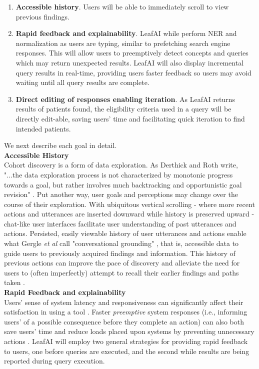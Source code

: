 \documentclass[../main.tex]{subfiles}
\begin{document}
\begin{enumerate}
    \item \textbf{Accessible history}. Users will be able to immediately scroll to view previous findings.
    \item \textbf{Rapid feedback and explainability}. LeafAI while perform NER and normalization as users are typing, similar to prefetching search engine responses. This will allow users to preemptively detect concepts and queries which may return unexpected results. LeafAI will also display incremental query results in real-time, providing users faster feedback so users may avoid waiting until all query results are complete.
    \item \textbf{Direct editing of responses enabling iteration}. As LeafAI returns results of patients found, the eligibility criteria used in a query will be directly edit-able, saving users' time and facilitating quick iteration to find intended patients.
\end{enumerate}

\noindent We next describe each goal in detail. \\

\noindent \textbf{Accessible History} \\
Cohort discovery is a form of data exploration. As Derthick and Roth write, "...the data exploration process is not characterized by monotonic progress towards a goal, but rather involves much backtracking and opportunistic goal revision" \cite{derthick2001enhancing}. Put another way, user goals and perceptions may change over the course of their exploration. With ubiquitous vertical scrolling - where more recent actions and utterances are inserted downward while history is preserved upward - chat-like user interfaces facilitate user understanding of past utterances and actions. Persisted, easily viewable history of user utterances and actions enable what Gergle \textit{et al} call "conversational grounding" \cite{gergle2004persistence}, that is, accessible data to guide users to previously acquired findings and information. This history of previous actions can improve the pace of discovery and alleviate the need for users to (often imperfectly) attempt to recall their earlier findings and paths taken \cite{hill1994history, gergle2004persistence}. \\

\noindent \textbf{Rapid Feedback and explainability} \\
Users' sense of system latency and responsiveness can significantly affect their satisfaction in using a tool \cite{li2019effects, arapakis2014impact, shneiderman1984response}. Faster \textit{preemptive} system responses (i.e., informing users' of a possible consequence before they complete an action) can also both save users' time and reduce loads placed upon systems by preventing unnecessary actions \cite{lempel2003predictive, diaz2016search}. LeafAI will employ two general strategies for providing rapid feedback to users, one before queries are executed, and the second while results are being reported during query execution.
\end{document}
